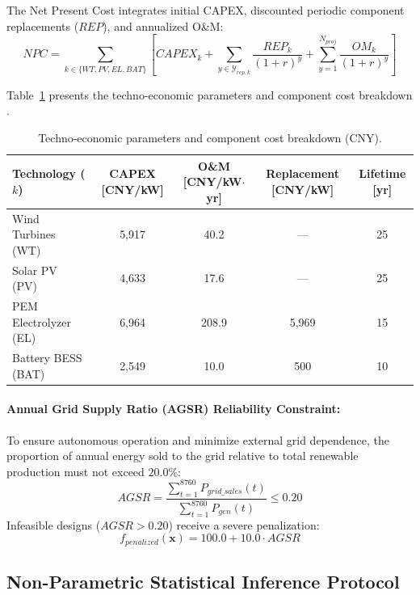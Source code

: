 The Net Present Cost integrates initial CAPEX, discounted periodic component replacements ($REP$), and annualized O\&M:
\begin{equation}
NPC = \sum_{k \in \{WT, PV, EL, BAT\}} \left[ CAPEX_k + \sum_{y \in \mathcal{Y}_{rep,k}} \frac{REP_k}{(1+r)^y} + \sum_{y=1}^{N_{proj}} \frac{OM_k}{(1+r)^y} \right]
\label{eq:npc_formulation}
\end{equation}

Table~\ref{tab:hres2_costs} presents the techno-economic parameters and component cost breakdown \cite{li2024capacity}.

\begin{table}[htbp]
\centering
\caption{Techno-economic parameters and component cost breakdown (CNY).}
\label{tab:hres2_costs}
\begin{tabular}{lcccc}
\toprule
\textbf{Technology ($k$)} & \textbf{CAPEX [CNY/kW]} & \textbf{O\&M [CNY/kW$\cdot$yr]} & \textbf{Replacement [CNY/kW]} & \textbf{Lifetime [yr]} \\
\midrule
Wind Turbines (WT) & 5,917 & 40.2 & --- & 25 \\
Solar PV (PV) & 4,633 & 17.6 & --- & 25 \\
PEM Electrolyzer (EL) & 6,964 & 208.9 & 5,969 & 15 \\
Battery BESS (BAT) & 2,549 & 10.0 & 500 & 10 \\
\bottomrule
\end{tabular}
\end{table}

\paragraph{Annual Grid Supply Ratio (AGSR) Reliability Constraint:}
To ensure autonomous operation and minimize external grid dependence, the proportion of annual energy sold to the grid relative to total renewable production must not exceed $20.0\%$:
\begin{equation}
AGSR = \frac{\displaystyle\sum_{t=1}^{8760} P_{grid\_sales}(t)}{\displaystyle\sum_{t=1}^{8760} P_{gen}(t)} \le 0.20
\label{eq:agsr_constraint}
\end{equation}
Infeasible designs ($AGSR > 0.20$) receive a severe penalization:
\begin{equation}
f_{penalized}(\mathbf{x}) = 100.0 + 10.0 \cdot AGSR
\label{eq:penalty_function}
\end{equation}


\subsection{Non-Parametric Statistical Inference Protocol}
\label{sec:statistical_protocol}

